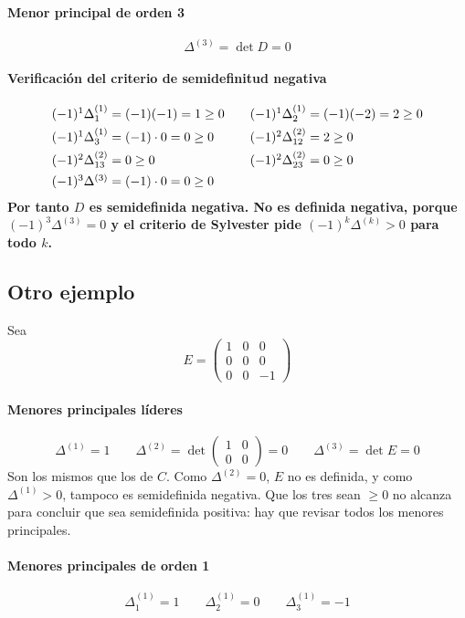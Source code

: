 \documentclass{article}
\begin{document}
\paragraph*{Menor principal de orden 3}
\[
\Delta^{(3)}=\det D=0
\]

\paragraph*{Verificación del criterio de semidefinitud negativa}
\[
\begin{array}{l@{\qquad}l}
(-1)^1\Delta^{(1)}_1=(-1)(-1)=1\ge0 & (-1)^1\Delta^{(1)}_2=(-1)(-2)=2\ge0\\[4pt]
(-1)^1\Delta^{(1)}_3=(-1)\cdot0=0\ge0 & (-1)^2\Delta^{(2)}_{12}=2\ge0\\[4pt]
(-1)^2\Delta^{(2)}_{13}=0\ge0 & (-1)^2\Delta^{(2)}_{23}=0\ge0\\[4pt]
(-1)^3\Delta^{(3)}=(-1)\cdot0=0\ge0 &
\end{array}
\]
\textbf{\color{teal}Por tanto \(D\) es semidefinida negativa. No es definida negativa, porque \((-1)^3\Delta^{(3)}=0\) y el criterio de Sylvester pide \((-1)^k\Delta^{(k)}>0\) para todo \(k\).}

\subsection*{Otro ejemplo}

Sea
\[
E=\begin{pmatrix}
1&0&0\\
0&0&0\\
0&0&-1
\end{pmatrix}
\]

\paragraph*{Menores principales líderes}
\[
\Delta^{(1)}=1\qquad\Delta^{(2)}=\det\begin{pmatrix}1&0\\0&0\end{pmatrix}=0\qquad\Delta^{(3)}=\det E=0
\]
Son los mismos que los de \(C\). Como \(\Delta^{(2)}=0\), \(E\) no es definida, y como \(\Delta^{(1)}>0\), tampoco es semidefinida negativa. Que los tres sean \(\ge0\) no alcanza para concluir que sea semidefinida positiva: hay que revisar todos los menores principales.

\paragraph*{Menores principales de orden 1}
\[
\Delta^{(1)}_1=1\qquad\Delta^{(1)}_2=0\qquad\Delta^{(1)}_3=-1
\]
\end{document}
